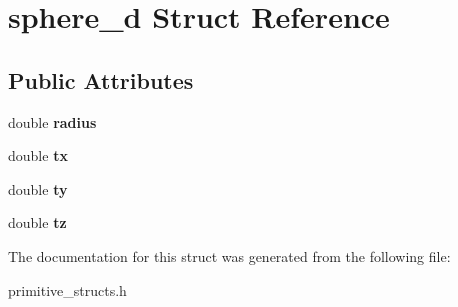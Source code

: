 \hypertarget{structsphere__d}{}\section{sphere\+\_\+d Struct Reference}
\label{structsphere__d}
\subsection*{Public Attributes}
\begin{DoxyCompactItemize}
\item 
double {\bfseries radius}\hypertarget{structsphere__d_a9330f8a21cd8a08874b776c3b369c275}{}\label{structsphere__d_a9330f8a21cd8a08874b776c3b369c275}

\item 
double {\bfseries tx}\hypertarget{structsphere__d_ad5280d13d2c5b7f99f2823a7dc9b6451}{}\label{structsphere__d_ad5280d13d2c5b7f99f2823a7dc9b6451}

\item 
double {\bfseries ty}\hypertarget{structsphere__d_a1af8a1f8d1a74643bc868da0066d665c}{}\label{structsphere__d_a1af8a1f8d1a74643bc868da0066d665c}

\item 
double {\bfseries tz}\hypertarget{structsphere__d_a8ff07278e54ecd85ee134b1d2829c903}{}\label{structsphere__d_a8ff07278e54ecd85ee134b1d2829c903}

\end{DoxyCompactItemize}


The documentation for this struct was generated from the following file\+:\begin{DoxyCompactItemize}
\item 
primitive\+\_\+structs.\+h\end{DoxyCompactItemize}
